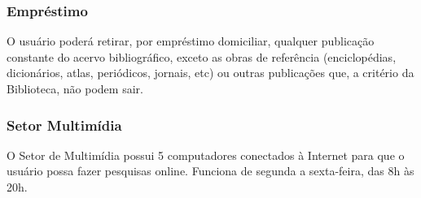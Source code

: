 \documentclass{paper}
\begin{document}
%
%
%
%

\subsubsection{Empréstimo}
O usuário poderá retirar, por empréstimo domiciliar, qualquer publicação constante do acervo bibliográfico, exceto as
obras de referência (enciclopédias, dicionários, atlas, periódicos, jornais, etc) ou outras publicações que, a critério
da Biblioteca, não podem sair.

\subsubsection{Setor Multimídia}
O Setor de Multimídia possui 5 computadores conectados à Internet para que o usuário possa fazer pesquisas online.
Funciona de segunda a sexta-feira, das 8h às 20h.
\end{document}
